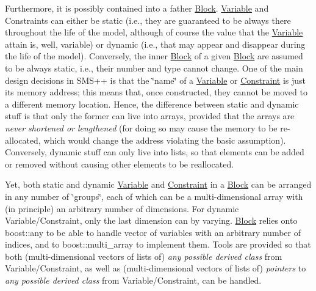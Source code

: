 Furthermore, it is possibly contained into a father \mbox{\hyperlink{class_s_m_spp__di__unipi__it_1_1_block}{Block}}. \mbox{\hyperlink{class_s_m_spp__di__unipi__it_1_1_variable}{Variable}} and Constraints can either be static (i.\+e., they are guaranteed to be always there throughout the life of the model, although of course the value that the \mbox{\hyperlink{class_s_m_spp__di__unipi__it_1_1_variable}{Variable}} attain is, well, variable) or dynamic (i.\+e., that may appear and disappear during the life of the model). Conversely, the inner \mbox{\hyperlink{class_s_m_spp__di__unipi__it_1_1_block}{Block}} of a given \mbox{\hyperlink{class_s_m_spp__di__unipi__it_1_1_block}{Block}} are assumed to be always static, i.\+e., their number and type cannot change. One of the main design decisions in S\+M\+S++ is that the \char`\"{}name\char`\"{} of a \mbox{\hyperlink{class_s_m_spp__di__unipi__it_1_1_variable}{Variable}} or \mbox{\hyperlink{class_s_m_spp__di__unipi__it_1_1_constraint}{Constraint}} is just its memory address; this means that, once constructed, they cannot be moved to a different memory location. Hence, the difference between static and dynamic stuff is that only the former can live into arrays, provided that the arrays are {\itshape never shortened or lengthened} (for doing so may cause the memory to be re-\/allocated, which would change the address violating the basic assumption). Conversely, dynamic stuff can only live into lists, so that elements can be added or removed without causing other elements to be reallocated.

Yet, both static and dynamic \mbox{\hyperlink{class_s_m_spp__di__unipi__it_1_1_variable}{Variable}} and \mbox{\hyperlink{class_s_m_spp__di__unipi__it_1_1_constraint}{Constraint}} in a \mbox{\hyperlink{class_s_m_spp__di__unipi__it_1_1_block}{Block}} can be arranged in any number of \char`\"{}groups\char`\"{}, each of which can be a multi-\/dimensional array with (in principle) an arbitrary number of dimensions. For dynamic Variable/\+Constraint, only the last dimension can by varying. \mbox{\hyperlink{class_s_m_spp__di__unipi__it_1_1_block}{Block}} relies onto boost\+::any to be able to handle vector of variables with an arbitrary number of indices, and to boost\+::multi\+\_\+array to implement them. Tools are provided so that both (multi-\/dimensional vectors of lists of) {\itshape any possible derived class} from Variable/\+Constraint, as well as (multi-\/dimensional vectors of lists of) {\itshape pointers} to {\itshape any possible derived class} from Variable/\+Constraint, can be handled.

